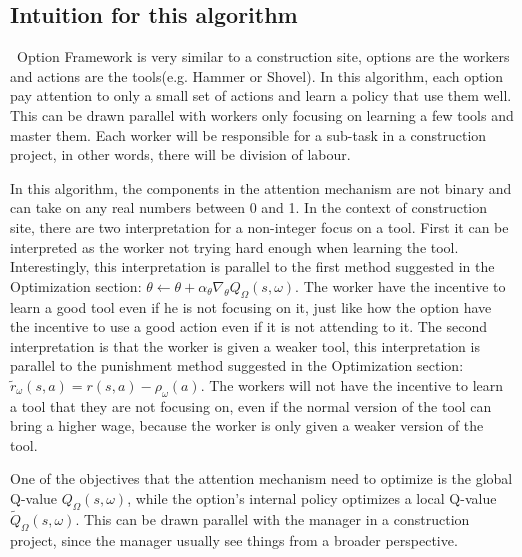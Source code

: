\documentclass{article}
\begin{document}
	\subsection*{Intuition for this algorithm}
	\qquad \ Option Framework is very similar to a construction site, options are the workers and actions are the tools(e.g. Hammer or Shovel). In this algorithm, each option pay attention to only a small set of actions and learn a policy that use them well. This can be drawn parallel with workers only focusing on learning a few tools and master them. Each worker will be responsible for a sub-task in a construction project, in other words, there will be division of labour. 
	
	\quad In this algorithm, the components in the attention mechanism are not binary and can take on any real numbers between 0 and 1. In the context of construction site, there are two interpretation for a non-integer focus on a tool. First it can be interpreted as the worker not trying hard enough when learning the tool. Interestingly, this interpretation is parallel to the first method suggested in the Optimization section: $\theta \leftarrow \theta + \alpha_\theta \nabla_\theta Q_\Omega(s,\omega)$. The worker have the incentive to learn a good tool even if he is not focusing on it, just like how the option have the incentive to use a good action even if it is not attending to it. The second interpretation is that the worker is given a weaker tool, this interpretation is parallel to the punishment method suggested in the Optimization section: $\widetilde{r}_\omega(s,a)=r(s,a)-\rho_\omega(a)$. The workers will not have the incentive to learn a tool that they are not focusing on, even if the normal version of the tool can bring a higher wage, because the worker is only given a weaker version of the tool.
	
	\quad One of the objectives that the attention mechanism need to optimize is the global Q-value $Q_\Omega(s,\omega)$, while the option's internal policy optimizes a local Q-value $\widetilde{Q}_\Omega(s, \omega)$. This can be drawn parallel with the manager in a construction project, since the manager usually see things from a broader perspective.\vspace{0.1in}
	
\end{document}
